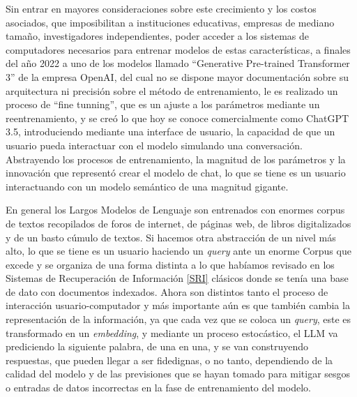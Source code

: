 \documentclass[
  12pt,
  openany]{book}
\begin{document}
Sin entrar en mayores consideraciones sobre este crecimiento y los costos asociados, que imposibilitan a instituciones educativas, empresas de mediano tamaño, investigadores independientes, poder acceder a los sistemas de computadores necesarios para entrenar modelos de estas características, a finales del año 2022 a uno de los modelos llamado ``Generative Pre-trained Transformer 3'' de la empresa OpenAI, del cual no se dispone mayor documentación sobre su arquitectura ni precisión sobre el método de entrenamiento, le es realizado un proceso de ``fine tunning'', que es un ajuste a los parámetros mediante un reentrenamiento, y se creó lo que hoy se conoce comercialmente como ChatGPT 3.5, introduciendo mediante una interface de usuario, la capacidad de que un usuario pueda interactuar con el modelo simulando una conversación. Abstrayendo los procesos de entrenamiento, la magnitud de los parámetros y la innovación que representó crear el modelo de chat, lo que se tiene es un usuario interactuando con un modelo semántico de una magnitud gigante.

En general los Largos Modelos de Lenguaje son entrenados con enormes corpus de textos recopilados de foros de internet, de páginas web, de libros digitalizados y de un basto cúmulo de textos. Si hacemos otra abstracción de un nivel más alto, lo que se tiene es un usuario haciendo un \emph{query} ante un enorme Corpus que excede y se organiza de una forma distinta a lo que habíamos revisado en los Sistemas de Recuperación de Información \ref{SRI} clásicos donde se tenía una base de dato con documentos indexados. Ahora son distintos tanto el proceso de interacción usuario-computador y más importante aún es que también cambia la representación de la información, ya que cada vez que se coloca un \emph{query}, este es transformado en un \emph{embedding}, y mediante un proceso estocástico, el LLM va prediciendo la siguiente palabra, de una en una, y se van construyendo respuestas, que pueden llegar a ser fidedignas, o no tanto, dependiendo de la calidad del modelo y de las previsiones que se hayan tomado para mitigar sesgos o entradas de datos incorrectas en la fase de entrenamiento del modelo.
\end{document}
